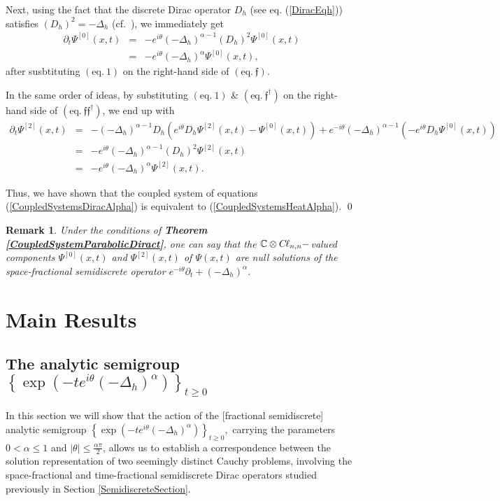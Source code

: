 \documentclass{elsarticle}
\newcommand{\BC}{{\mathbb C}}
\newcommand{\f}{{\mathfrak f}}
\newcommand{\cl}{C \kern -0.1em \ell}
\newtheorem{remark}{Remark}[section]
\begin{document}
Next, using the fact that the discrete Dirac operator $D_h$ (see eq. (\ref{DiracEqh})) satisfies $(D_h)^2=-\Delta_h$ (cf.~\cite[Proposition 2.1]{FaustinoKGordonDirac16}), we immediately get
\begin{eqnarray*}
	\partial_t\Psi^{[0]}(x,t)&=&-e^{i\theta}(-\Delta_h)^{\alpha-1}(D_h)^2\Psi^{[0]}(x,t) \\
	&=&-e^{i\theta}(-\Delta_h)^\alpha\Psi^{[0]}(x,t),
\end{eqnarray*}
after susbtituting
$(\mbox{eq.}~1)$ on the right-hand side of $(\mbox{eq.}~\f)$.

In the same order of ideas, by substituting $(\mbox{eq.}~1)$ \& $(\mbox{eq.}~\f^\dagger)$ on the right-hand side of $(\mbox{eq.}~\f\f^\dagger)$, we end up with
\begin{eqnarray*}
	\partial_t\Psi^{[2]}(x,t)&=&-(-\Delta_h)^{\alpha-1}D_h\left(e^{i\theta}D_h\Psi^{[2]}(x,t)-\Psi^{[0]}(x,t)\right)+e^{-i\theta}(-\Delta_h)^{\alpha-1}\left(-e^{i\theta}D_h\Psi^{[0]}(x,t)\right) \\
	&=&-e^{i\theta}(-\Delta_h)^{\alpha-1}(D_h)^2\Psi^{[2]}(x,t) \\
	&=&-e^{i\theta}(-\Delta_h)^{\alpha}\Psi^{[2]}(x,t).
\end{eqnarray*} 


Thus, we have shown that the coupled system of equations (\ref{CoupledSystemsDiracAlpha}) is equivalent to (\ref{CoupledSystemsHeatAlpha}).
\qed


\begin{remark}
	Under the conditions of {\bf Theorem \ref{CoupledSystemParabolicDiract}}, one can say that the $\BC\otimes\cl_{n,n}-$valued components $\Psi^{[0]}(x,t)$ and $\Psi^{[2]}(x,t)$ of $\Psi(x,t)$ are null solutions of the {\it space-fractional semidiscrete operator} $e^{-i\theta}\partial_t+(-\Delta_h)^\alpha$.
\end{remark}









\section{Main Results}\label{MainResultsSection}


\subsection{The analytic semigroup $\left\{\exp\left(-te^{i\theta}(-\Delta_h)^\alpha\right)\right\}_{t\geq 0}$}
In this section we will show that the action of the [fractional semidiscrete] analytic semigroup $\left\{\exp\left(-te^{i\theta}(-\Delta_h)^\alpha\right)\right\}_{t\geq 0},$ carrying the parameters $0<\alpha\leq 1$ and $|\theta|\leq \frac{\alpha \pi}{2}$, allows us to establish a correspondence between the solution representation of two seemingly distinct Cauchy problems, involving the space-fractional and time-fractional semidiscrete Dirac operators studied previously in Section \ref{SemidiscreteSection}.
\end{document}
